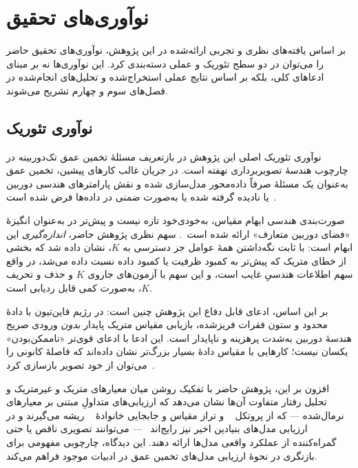 \section{نوآوری‌های تحقیق}
\label{sec:chapter5_novelty}

بر اساس یافته‌های نظری و تجربی ارائه‌شده در این پژوهش،
نوآوری‌های تحقیق حاضر را می‌توان
در دو سطح تئوریک و عملی دسته‌بندی کرد.
این نوآوری‌ها نه بر مبنای ادعاهای کلی،
بلکه بر اساس نتایج عملی استخراج‌شده
و تحلیل‌های انجام‌شده در فصل‌های سوم و چهارم
تشریح می‌شوند.

\subsection{نوآوری تئوریک}
\label{subsec:theoretical_novelty}

نوآوری تئوریک اصلی این پژوهش
در بازتعریف مسئلهٔ تخمین عمق تک‌دوربینه
در چارچوب هندسهٔ تصویربرداری نهفته است.
در جریان غالب کارهای پیشین،
تخمین عمق به‌عنوان یک مسئلهٔ صرفاً داده‌محور
مدل‌سازی شده
و نقش پارامترهای هندسی دوربین
یا نادیده گرفته شده
یا به‌صورت ضمنی در داده‌ها فرض شده است~\cite{Eigen2014Depth,Godard2019Digging,Ranftl2021DPT,DepthAnythingV2}.

صورت‌بندی هندسی ابهام مقیاس، به‌خودی‌خود تازه نیست و پیش‌تر در
 به‌عنوان انگیزهٔ «فضای دوربین متعارف» ارائه شده
است~\cite{Yin2023Metric3D}. سهم نظری پژوهش حاضر، \emph{اندازه‌گیری} این
ابهام است: با ثابت نگه‌داشتن همهٔ عوامل جز دسترسی به $K$، نشان داده شد که
بخشی از خطای متریک که پیش‌تر به کمبود ظرفیت یا کمبود داده نسبت داده می‌شد،
در واقع سهم اطلاعات هندسیِ غایب است، و این سهم با آزمون‌های جاروی $K$ و حذف
و تحریف $K$، به‌صورت کمی قابل ردیابی است.

بر این اساس، ادعای قابل دفاع این پژوهش چنین است: در رژیم فاین‌تیون با دادهٔ
محدود و ستون فقرات فریزشده، بازیابی مقیاس متریک پایدار \emph{بدون} ورودی
صریح هندسهٔ دوربین به‌شدت پرهزینه و ناپایدار است. این ادعا با ادعای قوی‌تر
«ناممکن‌بودن» یکسان نیست؛ کارهایی با مقیاس دادهٔ بسیار بزرگ‌تر نشان داده‌اند
که فاصلهٔ کانونی را می‌توان از خود تصویر بازسازی کرد~\cite{Bochkovskii2025DepthPro}.

افزون بر این،
پژوهش حاضر با تفکیک روشن
میان معیارهای متریک و غیرمتریک
و تحلیل رفتار متفاوت آن‌ها
نشان می‌دهد که
ارزیابی‌های متداولِ مبتنی بر معیارهای نرمال‌شده --- که از پروتکل
~\cite{Eigen2014Depth} و تراز مقیاس و جابجایی خانوادهٔ
~\cite{Ranftl2019Robust} ریشه می‌گیرند و در ارزیابی مدل‌های
بنیادین اخیر نیز رایج‌اند~\cite{DepthAnythingV2} ---
می‌توانند تصویری ناقص یا حتی گمراه‌کننده
از عملکرد واقعی مدل‌ها ارائه دهند.
این دیدگاه،
چارچوبی مفهومی برای بازنگری
در نحوهٔ ارزیابی مدل‌های تخمین عمق
در ادبیات موجود فراهم می‌کند.

